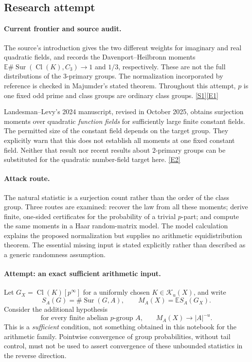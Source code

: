 \documentclass[11pt,a4paper]{article}
\newcommand{\E}{\mathbb{E}}
\newcommand{\sref}[2]{\hyperlink{source:#1:#2}{[S#2]}}
\newcommand{\eref}[2]{\hyperlink{extra:#1:#2}{[E#2]}}
\numberwithin{equation}{section}
\begin{document}
\subsection{Research attempt}

\paragraph{Current frontier and source audit.}
The source's introduction gives the two different weights for imaginary
and real quadratic fields, and records the Davenport--Heilbronn moments
$\E\#\operatorname{Sur}(\operatorname{Cl}(K),C_3)\to1$ and $1/3$,
respectively. These are not the full distributions of the $3$-primary
groups. The normalization incorporated by reference is checked in
Majumder's stated theorem. Throughout this attempt, $p$ is one fixed odd
prime and class groups are ordinary class groups. \sref{statement}{1}\eref{statement}{1}

Landesman--Levy's 2024 manuscript, revised in October 2025, obtains
surjection moments over quadratic \emph{function fields} for sufficiently
large finite constant fields. The permitted size of the constant field
depends on the target group. They explicitly warn that this does not
establish all moments at one fixed constant field. Neither that result
nor recent results about $2$-primary groups can be substituted for the
quadratic number-field target here. \eref{statement}{2}

\paragraph{Attack route.}
The natural statistic is a surjection count rather than the order of the
class group. Three routes are examined: recover the law from all these
moments; derive finite, one-sided certificates for the probability of a
trivial $p$-part; and compute the same moments in a Haar random-matrix
model. The model calculation explains the proposed normalization but
supplies no arithmetic equidistribution theorem. The essential missing
input is stated explicitly rather than described as a generic randomness
assumption.

\paragraph{Attempt: an exact sufficient arithmetic input.}
Let $G_X=\operatorname{Cl}(K)[p^\infty]$ for a uniformly chosen
$K\in\mathcal K_u(X)$, and write
\[
 S_A(G)=\#\operatorname{Sur}(G,A),\qquad
 M_A(X)=\E S_A(G_X).
\]
Consider the additional hypothesis
\begin{equation}\label{eq:statement:moments}
 \text{for every finite abelian $p$-group $A$,}\qquad
 M_A(X)\longrightarrow |A|^{-u}.
\end{equation}
This is a \emph{sufficient} condition, not something obtained in this
notebook for the arithmetic family. Pointwise convergence of group
probabilities, without tail control, must not be used to assert convergence
of these unbounded statistics in the reverse direction.
\end{document}
